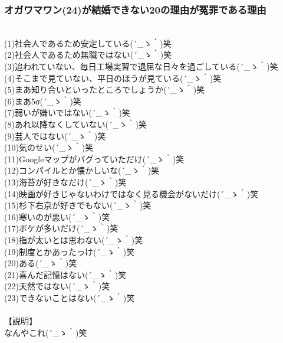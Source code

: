 \subsubsection{オガワマワン(24)が結婚できない20の理由が冤罪である理由}
　\\
(1)社会人であるため安定している{\sf (´\_ゝ｀)}笑\\
(2)社会人であるため無職ではない{\sf (´\_ゝ｀)}笑\\
(3)追われていない、毎日工場実習で退屈な日々を過ごしている{\sf (´\_ゝ｀)}笑\\
(4)そこまで見ていない、平日のほうが見ている{\sf (´\_ゝ｀)}笑\\
(5)まあ知り合いといったところでしょうか{\sf (´\_ゝ｀)}笑\\
(6)まあ5σ{\sf (´\_ゝ｀)}笑\\
(7)弱いが嫌いではない{\sf (´\_ゝ｀)}笑\\
(8)あれ以降なくしていない{\sf (´\_ゝ｀)}笑\\
(9)芸人ではない{\sf (´\_ゝ｀)}笑\\
(10)気のせい{\sf (´\_ゝ｀)}笑\\
(11)Googleマップがバグっていただけ{\sf (´\_ゝ｀)}笑\\
(12)コンパイルとか懐かしいな{\sf (´\_ゝ｀)}笑\\
(13)海苔が好きなだけ{\sf (´\_ゝ｀)}笑\\
(14)映画が好きじゃないわけではなく見る機会がないだけ{\sf (´\_ゝ｀)}笑\\
(15)杉下右京が好きでもない{\sf (´\_ゝ｀)}笑\\
(16)寒いのが悪い{\sf (´\_ゝ｀)}笑\\
(17)ボケが多いだけ{\sf (´\_ゝ｀)}笑\\
(18)指が太いとは思わない{\sf (´\_ゝ｀)}笑\\
(19)制度とかあったっけ{\sf (´\_ゝ｀)}笑\\
(20)ある{\sf (´\_ゝ｀)}笑\\
(21)喜んだ記憶はない{\sf (´\_ゝ｀)}笑\\
(22)天然ではない{\sf (´\_ゝ｀)}笑\\
(23)できないことはない{\sf (´\_ゝ｀)}笑\\
\\
【説明】\\
なんやこれ{\sf (´\_ゝ｀)}笑\\


\newpage
